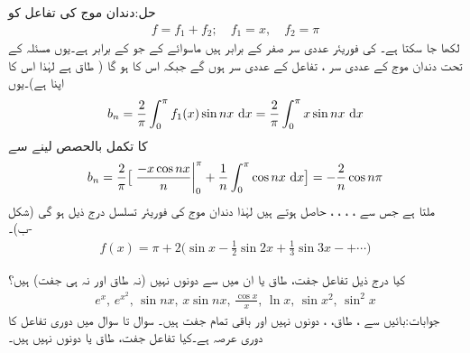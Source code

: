 حل:دندان موج کی تفاعل کو
\begin{align*}
f=f_1+f_2;\quad f_1=x,\quad f_2=\pi
\end{align*}
لکھا جا سکتا ہے۔ کی فوریئر عددی سر صفر کے برابر ہیں ماسوائے  کے جو  کے برابر ہے۔یوں مسئلہ  کے تحت دندان موج کے عددی سر ،  تفاعل  کے عددی سر ہوں گے جبکہ اس کا  ہو گا ( طاق ہے لہٰذا اس کا اپنا  ہے)۔یوں
\begin{align*}
b_n=\frac{2}{\pi}\int_0^{\pi} f_1(x)\sin nx\,\dif x=\frac{2}{\pi}\int_0^{\pi} x\sin nx\,\dif x
\end{align*}
کا تکمل بالحصص لینے سے
\begin{align*}
b_n=\frac{2}{\pi}\big[\left. \frac{-x\cos nx}{n}\right|_0^{\pi}+\frac{1}{n}\int_0^{\pi} \cos nx\,\dif x\big]=-\frac{2}{n}\cos n\pi
\end{align*}
ملتا ہے جس سے ، ، ، ،  حاصل ہوتے ہیں لہٰذا دندان موج کی فوریئر تسلسل درج ذیل ہو گی (شکل -ب)۔
\begin{align*}
f(x)=\pi+2\big(\sin x-\frac{1}{2}\sin 2x+\frac{1}{3}\sin 3x-+\cdots\big)
\end{align*}



\quad کیا درج ذیل تفاعل جفت، طاق یا ان میں سے دونوں نہیں (نہ طاق اور نہ ہی جفت) ہیں؟\\
\begin{align*}
e^x,\, e^{x^2},\, \sin nx,\,x\sin nx,\, \frac{\cos x}{x},\, \ln x,\, \sin x^2,\, \sin^2 x
\end{align*}
جوابات:بائیں سے  ،  طاق، ،  دونوں نہیں اور باقی تمام جفت ہیں۔
سوال  تا سوال  میں دوری تفاعل  کا دوری عرصہ  ہے۔کیا تفاعل جفت، طاق یا دونوں نہیں ہیں۔

